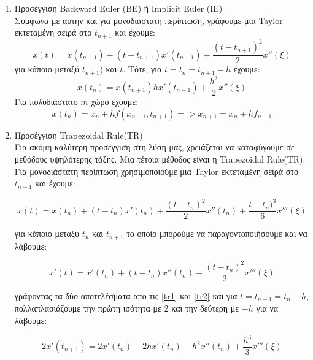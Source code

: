 \begin{enumerate}
  \item Προσέγγιση \textlatin{Backward Euler (BE)} ή \textlatin{Implicit Euler (IE)}\\
        Σύμφωνα με αυτήν και για μονοδιάστατη περίπτωση, γράφουμε μια \textlatin{Taylor} εκτεταμένη σειρά στο $t_{n+1}$ και έχουμε:\\
        \begin{equation}
            x(t) = x(t_{n+1}) + (t - t_{n+1}) x'(t_{n+1}) + \frac{(t - t_{n+1})^2}{2}x''(\xi)
        \end{equation}
        για κάποιο \xi μεταξύ $t_{n+1})$ και $t$. Τότε, για $t = t_n = t_{n+1} - h$ έχουμε:
        \begin{equation}
            x(t_n) = x(t_{n+1}) h x'(t_{n+1}) + \frac{h^2}{2}x''(\xi)
        \end{equation}
        Για πολυδιάστατο $m$ χώρο έχουμε:
        \begin{equation}
            x(t_n) = x_n + h f(x_{n+1}, t_{n+1}) => x_{n+1} = x_n + hf_{n+1}
        \end{equation}
 \item Προσέγγιση \textlatin{Trapezoidal Rule(TR)}\\
    Για ακόμη καλύτερη προσέγγιση στη λύση μας, χρειάζεται να καταφύγουμε σε μεθόδους υψηλότερης τάξης. Μια τέτοια μέθοδος είναι η \textlatin{Trapezoidal Rule(TR)}. Για μονοδιάστατη περίπτωση χρησιμοποιούμε μια \textlatin{Taylor} εκτεταμένη σειρά στο $t_{n+1}$ και έχουμε:
    
    \begin{equation} \label{tr1}
      x(t) = x(t_n) + (t - t_n) x'(t_n) + \frac{(t - t_n)^2}{2}x''(t_n) + \frac{t - t_n)^3}{6} x'''(\xi)
    \end{equation}
    
    για κάποιο \xi μεταξύ $t_n$ και $t_{n+1}$ το οποίο μπορούμε να παραγοντοποιήσουμε και να λάβουμε:
    
    \begin{equation} \label{tr2}
      x'(t) = x'(t_n) + (t - t_n) x''(t_n) + \frac{(t - t_n)^2}{2}x'''(\xi)
    \end{equation}
    
    γράφοντας τα δύο αποτελέσματα απο τις \ref{tr1} και \ref{tr2} και για $t = t_{n+1} = t_n + h$, πολλαπλασιάζουμε την πρώτη ισότητα με 2 και την δεύτερη με $-h$ για να λάβουμε:
    
    \begin{equation}
      2x'(t_{n+1}) = 2x'(t_n) + 2h x'(t_n) + h^2 x''(t_n) + \frac{h^3}{3}x'''(\xi)
    \end{equation}
    

\end{enumerate}

